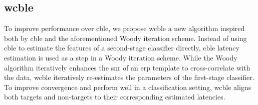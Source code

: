 \subsection{\acl{wcble}}
\label{sec:wcble/methods/wcble}
To improve performance over \ac{cble}, we propose \ac{wcble} a new algorithm inspired both by
\ac{cble} and the aforementioned Woody iteration scheme.
Instead of using \ac{cble} to estimate the features of a second-stage classifier
directly, \ac{cble} latency estimation is used as a step in a Woody iteration scheme.
While the Woody algorithm iteratively enhances the \ac{snr} of an \ac{erp} template to
cross-correlate with the data, \ac{wcble} iteratively re-estimates the parameters of
the first-stage classifier.
To improve convergence and perform well in a classification setting, \ac{wcble}
aligns both targets and non-targets to their corresponding estimated latencies.

